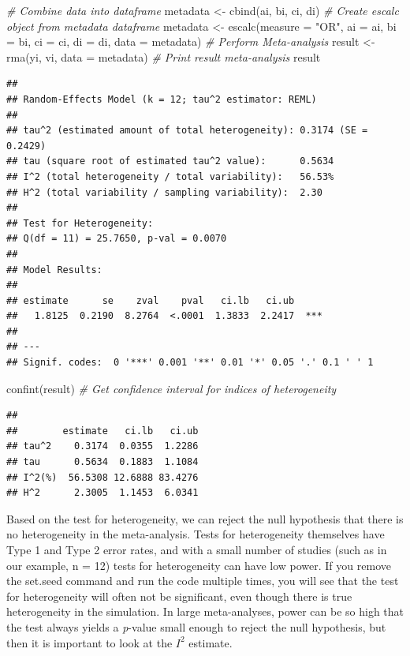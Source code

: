 \documentclass[
  oneside]{book}
\newenvironment{Shaded}{\begin{snugshade}}{\end{snugshade}}
\newcommand{\AttributeTok}[1]{\textcolor[rgb]{0.77,0.63,0.00}{#1}}
\newcommand{\CommentTok}[1]{\textcolor[rgb]{0.56,0.35,0.01}{\textit{#1}}}
\newcommand{\FunctionTok}[1]{\textcolor[rgb]{0.00,0.00,0.00}{#1}}
\newcommand{\NormalTok}[1]{#1}
\newcommand{\OtherTok}[1]{\textcolor[rgb]{0.56,0.35,0.01}{#1}}
\newcommand{\StringTok}[1]{\textcolor[rgb]{0.31,0.60,0.02}{#1}}
\begin{document}
\begin{Shaded}
\begin{Highlighting}[]
\CommentTok{\# Combine data into dataframe}
\NormalTok{metadata }\OtherTok{\textless{}{-}} \FunctionTok{cbind}\NormalTok{(ai, bi, ci, di)}
\CommentTok{\# Create escalc object from metadata dataframe }
\NormalTok{metadata }\OtherTok{\textless{}{-}} \FunctionTok{escalc}\NormalTok{(}\AttributeTok{measure =} \StringTok{"OR"}\NormalTok{, }
                   \AttributeTok{ai =}\NormalTok{ ai, }\AttributeTok{bi =}\NormalTok{ bi, }\AttributeTok{ci =}\NormalTok{ ci, }\AttributeTok{di =}\NormalTok{ di, }
                   \AttributeTok{data =}\NormalTok{ metadata)}
\CommentTok{\# Perform Meta{-}analysis}
\NormalTok{result }\OtherTok{\textless{}{-}} \FunctionTok{rma}\NormalTok{(yi, vi, }\AttributeTok{data =}\NormalTok{ metadata)}
\CommentTok{\# Print result meta{-}analysis}
\NormalTok{result}
\end{Highlighting}
\end{Shaded}

\begin{verbatim}
## 
## Random-Effects Model (k = 12; tau^2 estimator: REML)
## 
## tau^2 (estimated amount of total heterogeneity): 0.3174 (SE = 0.2429)
## tau (square root of estimated tau^2 value):      0.5634
## I^2 (total heterogeneity / total variability):   56.53%
## H^2 (total variability / sampling variability):  2.30
## 
## Test for Heterogeneity:
## Q(df = 11) = 25.7650, p-val = 0.0070
## 
## Model Results:
## 
## estimate      se    zval    pval   ci.lb   ci.ub 
##   1.8125  0.2190  8.2764  <.0001  1.3833  2.2417  *** 
## 
## ---
## Signif. codes:  0 '***' 0.001 '**' 0.01 '*' 0.05 '.' 0.1 ' ' 1
\end{verbatim}

\begin{Shaded}
\begin{Highlighting}[]
\FunctionTok{confint}\NormalTok{(result) }\CommentTok{\# Get confidence interval for indices of heterogeneity}
\end{Highlighting}
\end{Shaded}

\begin{verbatim}
## 
##        estimate   ci.lb   ci.ub 
## tau^2    0.3174  0.0355  1.2286 
## tau      0.5634  0.1883  1.1084 
## I^2(%)  56.5308 12.6888 83.4276 
## H^2      2.3005  1.1453  6.0341
\end{verbatim}

Based on the test for heterogeneity, we can reject the null hypothesis that there is no heterogeneity in the meta-analysis. Tests for heterogeneity themselves have Type 1 and Type 2 error rates, and with a small number of studies (such as in our example, n = 12) tests for heterogeneity can have low power. If you remove the set.seed command and run the code multiple times, you will see that the test for heterogeneity will often not be significant, even though there is true heterogeneity in the simulation. In large meta-analyses, power can be so high that the test always yields a \emph{p}-value small enough to reject the null hypothesis, but then it is important to look at the \(I^2\) estimate.
\end{document}
